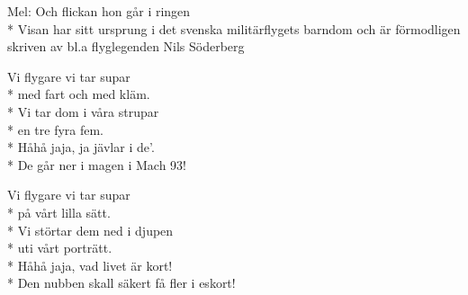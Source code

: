 \begin{SongText}[Flygarsupen]
    \begin{SongInfo}
        Mel: Och flickan hon går i ringen\\*%
        Visan har sitt ursprung i det svenska militärflygets barndom och är förmodligen skriven av bl.a flyglegenden Nils Söderberg
    \end{SongInfo}
    \begin{SongVerse}
        Vi flygare vi tar supar\\*%
        med fart och med kläm.\\*%
        Vi tar dom i våra strupar\\*%
        en tre fyra fem.\\*%
        Håhå jaja, ja jävlar i de'.\\*%
        De går ner i magen i Mach 93!
    \end{SongVerse}
    \begin{SongVerse}
        Vi flygare vi tar supar\\*%
        på vårt lilla sätt.\\*%
        Vi störtar dem ned i djupen\\*%
        uti vårt porträtt.\\*%
        Håhå jaja, vad livet är kort!\\*%
        Den nubben skall säkert få fler i eskort!
    \end{SongVerse}
\end{SongText}
